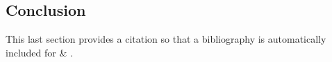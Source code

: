 \documentclass[11pt]{article}%
\begin{document}
\begin{multicols*}{2}
\section{Conclusion}
\label{Conclusion}

This last section provides a citation so that a bibliography is
automatically included for \parencite{book:linear-algebra} \& \parencite{book:middlemarch}.


\printbibliography %


\end{multicols*}
\end{document}
